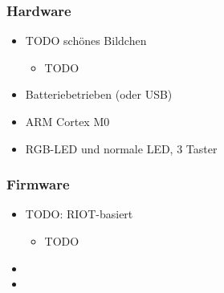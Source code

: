 \documentclass{beamer}
\begin{document}

\begin{frame}
    \frametitle{Hardware}

    \begin{itemize}
        \item TODO schönes Bildchen
            \begin{itemize}
                \item TODO
            \end{itemize}
        \item Batteriebetrieben (oder USB)
        \item ARM Cortex M0
        \item RGB-LED und normale LED, 3 Taster
    \end{itemize}
\end{frame}

\begin{frame}
    \frametitle{Firmware}

    \begin{itemize}
        \item TODO: RIOT-basiert
            \begin{itemize}
                \item TODO
            \end{itemize}
        \item
        \item
    \end{itemize}
\end{frame}
\end{document}
